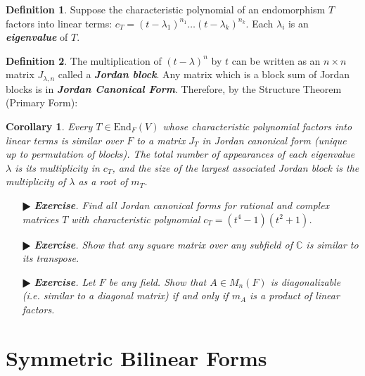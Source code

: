 \documentclass[11pt]{amsart}
\newtheorem*{corollary*}{Corollary}
\theoremstyle{definition}
\newtheorem*{definition*}{Definition}
\renewcommand\:{\colon}
\newcommand{\1}{\mathds{1}}
\newcommand{\End}{\text{End}}
\newcommand{\exc}[1]{\vspace{-2.5pt}\begin{itemize}[leftmargin=15pt]\item[$\RHD$] \textit{\textbf{Exercise}. #1}\end{itemize}}
\begin{document}
\begin{definition*}
	Suppose the characteristic polynomial of an endomorphism $T$ factors into linear terms: $c_T = (t - \lambda_1)^{n_1}\dots(t - \lambda_k)^{n_k}$. Each $\lambda_i$ is an \textbf{\textit{eigenvalue}} of $T$. 
\end{definition*}

\begin{definition*}
	The multiplication of $(t - \lambda)^n$ by $t$ can be written as an $n \times n$ matrix $J_{\lambda, n}$ called a \textbf{\textit{Jordan block}}. Any matrix which is a block sum of Jordan blocks is in \textbf{\textit{Jordan Canonical Form}}. Therefore, by the Structure Theorem (Primary Form):
\end{definition*}

\begin{corollary*}
	Every $T \in \End_F(V)$ whose characteristic polynomial factors into linear terms is similar over $F$ to a matrix $J_T$ in Jordan canonical form (unique up to permutation of blocks). The total number of appearances of each eigenvalue $\lambda$ is its multiplicity in $c_T$, and the size of the largest associated Jordan block is the multiplicity of $\lambda$ as a root of $m_T$.
\end{corollary*}

\exc{Find all Jordan canonical forms for rational and complex matrices $T$ with characteristic polynomial $c_T = (t^4 - 1)(t^2 + 1)$.}
\exc{Show that any square matrix over any subfield of $\mathds C$ is similar to its transpose.}
\exc{Let $F$ be any field. Show that $A \in M_n(F)$ is diagonalizable (i.e. similar to a diagonal matrix) if and only if $m_A$ is a product of linear factors.}




\clearpage




\section{Symmetric Bilinear Forms}
\end{document}
